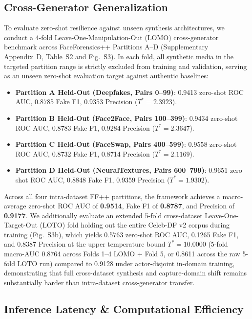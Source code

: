 \documentclass[10pt,twocolumn,letterpaper]{article}
\begin{document}
\subsection{Cross-Generator Generalization}
\label{sec:exp_generalization}

To evaluate zero-shot resilience against unseen synthesis architectures, we conduct a 4-fold Leave-One-Manipulation-Out (LOMO) cross-generator benchmark across FaceForensics++ Partitions A--D (Supplementary Appendix~D, Table~S2 and Fig.~S3). In each fold, all synthetic media in the targeted partition range is strictly excluded from training and validation, serving as an unseen zero-shot evaluation target against authentic baselines:
\begin{itemize}
\item \textbf{Partition A Held-Out (Deepfakes, Pairs 0--99)}: 0.9413 zero-shot ROC AUC, 0.8785 Fake F1, 0.9353 Precision ($T^* = 2.3923$).
\item \textbf{Partition B Held-Out (Face2Face, Pairs 100--399)}: 0.9434 zero-shot ROC AUC, 0.8783 Fake F1, 0.9284 Precision ($T^* = 2.3647$).
\item \textbf{Partition C Held-Out (FaceSwap, Pairs 400--599)}: 0.9558 zero-shot ROC AUC, 0.8732 Fake F1, 0.8714 Precision ($T^* = 2.1169$).
\item \textbf{Partition D Held-Out (NeuralTextures, Pairs 600--799)}: 0.9651 zero-shot ROC AUC, 0.8848 Fake F1, 0.9359 Precision ($T^* = 1.9302$).
\end{itemize}
Across all four intra-dataset FF++ partitions, the framework achieves a macro-average zero-shot ROC AUC of \textbf{0.9514}, Fake F1 of \textbf{0.8787}, and Precision of \textbf{0.9177}. We additionally evaluate an extended 5-fold cross-dataset Leave-One-Target-Out (LOTO) fold holding out the entire Celeb-DF v2 corpus during training (Fig.~S3b), which yields 0.5763 zero-shot ROC AUC, 0.1265 Fake F1, and 0.8387 Precision at the upper temperature bound $T^* = 10.0000$ (5-fold macro-AUC 0.8764 across Folds 1--4 LOMO + Fold 5, or 0.8611 across the raw 5-fold LOTO run) compared to 0.9128 under actor-disjoint in-domain training, demonstrating that full cross-dataset synthesis and capture-domain shift remains substantially harder than intra-dataset cross-generator transfer.

\subsection{Inference Latency \& Computational Efficiency}
\label{sec:exp_latency}
\end{document}
